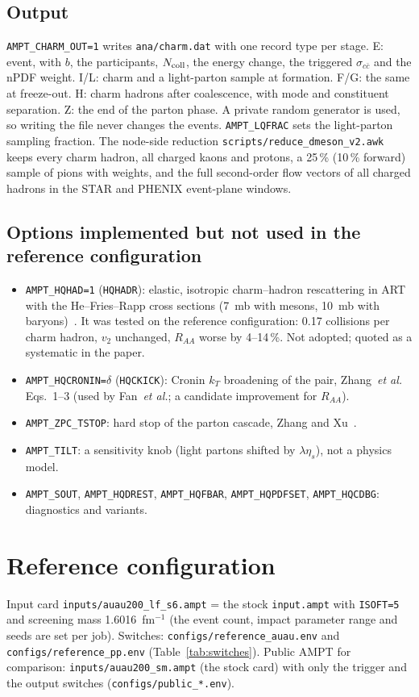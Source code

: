 \documentclass[11pt,a4paper]{article}
\newcommand{\sw}[1]{\texttt{#1}}
\newcommand{\code}[1]{\texttt{#1}}
\begin{document}
\subsection{Output}
\sw{AMPT\_CHARM\_OUT=1} writes \code{ana/charm.dat} with one record type per stage. E: event, with $b$, the
participants, $N_{\rm coll}$, the energy change, the triggered $\sigma_{c\bar c}$ and the nPDF weight. I/L: charm and
a light-parton sample at formation. F/G: the same at freeze-out. H: charm hadrons after coalescence, with mode and
constituent separation. Z: the end of the parton phase. A private random generator is used, so writing the file never
changes the events. \sw{AMPT\_LQFRAC} sets the light-parton sampling fraction. The node-side reduction
\code{scripts/reduce\_dmeson\_v2.awk} keeps every charm hadron, all charged kaons and protons, a 25\,\% (10\,\%
forward) sample of pions with weights, and the full second-order flow vectors of all charged hadrons in the STAR and
PHENIX event-plane windows.

\subsection{Options implemented but not used in the reference configuration}
\begin{itemize}
\item \sw{AMPT\_HQHAD=1} (\code{HQHADR}): elastic, isotropic charm--hadron rescattering in ART with the He--Fries--Rapp
  cross sections (7~mb with mesons, 10~mb with baryons)~\cite{hfr2011}. It was tested on the reference configuration:
  0.17 collisions per charm hadron, $v_2$ unchanged, $R_{AA}$ worse by 4--14\,\%. Not adopted; quoted as a
  systematic in the paper.
\item \sw{AMPT\_HQCRONIN=$\delta$} (\code{HQCKICK}): Cronin $k_T$ broadening of the pair, Zhang~\emph{et
  al.}~\cite{zhang2023} Eqs.~1--3 (used by Fan~\emph{et al.}; a candidate improvement for $R_{AA}$).
\item \sw{AMPT\_ZPC\_TSTOP}: hard stop of the parton cascade, Zhang and Xu~\cite{zhangxu2017}.
\item \sw{AMPT\_TILT}: a sensitivity knob (light partons shifted by $\lambda\eta_s$), not a physics model.
\item \sw{AMPT\_SOUT}, \sw{AMPT\_HQDREST}, \sw{AMPT\_HQFBAR}, \sw{AMPT\_HQPDFSET}, \sw{AMPT\_HQCDBG}: diagnostics and
  variants.
\end{itemize}

\section{Reference configuration}
Input card \code{inputs/auau200\_lf\_s6.ampt} = the stock \code{input.ampt} with \code{ISOFT=5} and screening mass
1.6016~fm$^{-1}$ (the event count, impact parameter range and seeds are set per job). Switches:
\code{configs/reference\_auau.env} and \code{configs/reference\_pp.env} (Table~\ref{tab:switches}). Public AMPT for
comparison: \code{inputs/auau200\_sm.ampt} (the stock card) with only the trigger and the output switches
(\code{configs/public\_*.env}).
\end{document}
